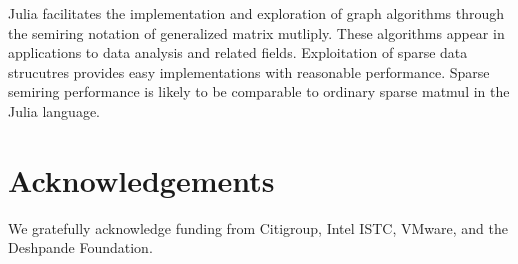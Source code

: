 \documentclass[conference]{IEEEtran}
\begin{document}
Julia facilitates the implementation and exploration of graph algorithms through
the semiring notation of generalized matrix mutliply.  These algorithms appear
in applications to data analysis and related fields.  Exploitation of sparse data
strucutres provides easy implementations with reasonable performance.
Sparse semiring performance is likely to be comparable to ordinary sparse matmul in the Julia
language.

\section{Acknowledgements}

We gratefully acknowledge funding from Citigroup, Intel ISTC, VMware, and the Deshpande Foundation.



\end{document}
